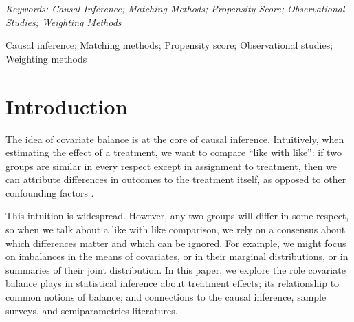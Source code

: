 \documentclass{article}
\theoremstyle{definition}
\newcommand{\<}{\langle}
\renewcommand{\>}{\rangle}
\begin{document}
\ifarxiv
  \noindent\emph{Keywords: Causal Inference; Matching Methods; Propensity Score; Observational Studies; Weighting Methods}
  \vfill
\else
  \begin{keywords}
  Causal inference; Matching methods; Propensity score; Observational studies; Weighting methods
  \end{keywords}
\fi

\newpage

\section{Introduction}
\label{sec:intro}

The idea of covariate balance is at the core of causal inference.
Intuitively, when estimating the effect of a treatment, we want to compare ``like with like'': if two groups are similar in every respect except in assignment to treatment, then we can attribute differences in outcomes to the treatment itself, as opposed to other confounding factors \citep{cochran1965planning}.

This intuition is widespread. However, any two groups will differ in some respect, so when we talk about a like with like comparison,
we rely on a consensus about which
differences matter and which can be ignored.
For example, we might focus on imbalances in the means of covariates, or in their marginal distributions, or in summaries of their joint distribution. In this paper,
we explore the role covariate balance plays in statistical inference about treatment effects; its relationship to common notions of balance; and connections to the causal inference, sample surveys, and semiparametrics literatures.
\end{document}
